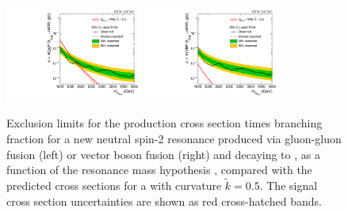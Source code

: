 \begin{figure}[htbp]
  \centering
  \includegraphics[width=0.4\textwidth]{fig/results/limits_GbuToWW.pdf}
  \includegraphics[width=0.4\textwidth]{fig/results/limits_VBFGbuToWW.pdf}
  \caption{
    Exclusion limits for the production cross section times branching fraction for a new neutral spin-2 resonance produced via gluon-gluon fusion (left) or vector boson fusion (right) and decaying to \WW, as a function of the resonance mass hypothesis \MX, compared with the predicted cross sections for a \GBulk with curvature $\tilde{k}=0.5$.
    The signal cross section uncertainties are shown as red cross-hatched bands.
  }
  \label{fig:limits_spin2}
\end{figure}
